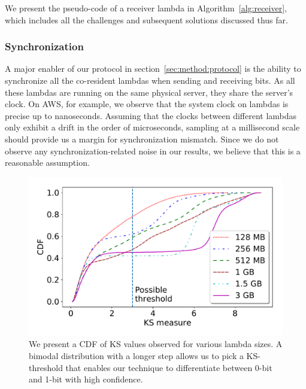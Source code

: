 We present the pseudo-code of a receiver lambda in Algorithm~\ref{alg:receiver},
which includes all the challenges and subsequent solutions discussed thus
far.

\subsubsection{Synchronization} 
A major enabler of our protocol in section~\ref{sec:method:protocol} is the ability 
to synchronize all the co-resident lambdas when sending and receiving 
bits. As all these lambdas are running on the same physical
server, they share the server's clock. On AWS, for example, we observe that the
system clock on lambdas is precise up to nanoseconds. 
Assuming that the clocks between different lambdas only exhibit a drift in the order
of microseconds, sampling at a millisecond scale should provide us a margin for
synchronization mismatch. Since we do not observe any synchronization-related
noise in our results, we believe that this is a reasonable assumption.


\begin{figure}[!t]
  \includegraphics[width=.99\linewidth]{fig/ksvalues.pdf}
  \caption{We present a CDF of KS values observed for various lambda sizes. A bimodal distribution 
  with a longer step allows us to pick a KS-threshold that enables our technique to differentiate 
  between 0-bit and 1-bit with high confidence. 
\label{fig:ks_values}}
\end{figure}



